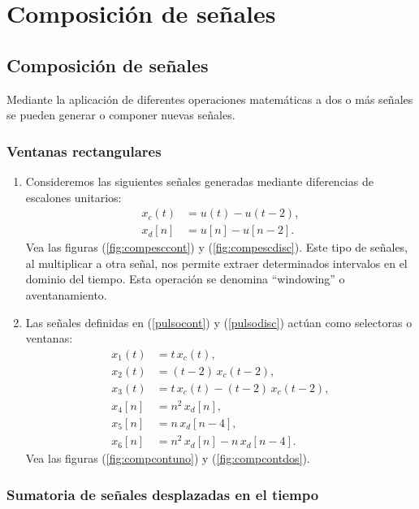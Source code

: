 \chapter{Composición de señales}

\section{Composición de señales}

Mediante la aplicación de diferentes operaciones matemáticas a
dos o más señales se pueden generar o componer nuevas señales.

\subsection{Ventanas rectangulares}

\begin{enumerate}
	\item Consideremos las siguientes señales generadas mediante
	diferencias de escalones unitarios:
	\begin{align}
		x_{c}(t) &= u(t) - u(t-2), \label{pulsocont} \\
		x_{d}[n] &= u[n] - u[n-2]. \label{pulsodisc}
	\end{align}
	Vea las figuras (\ref{fig:compesccont}) y (\ref{fig:compescdisc}).
	Este tipo de señales, al multiplicar a otra señal, nos permite
	extraer determinados intervalos en el dominio del tiempo. Esta
	operación se denomina ``windowing'' o aventanamiento.
	
	\item Las señales definidas en (\ref{pulsocont}) y
	(\ref{pulsodisc}) actúan como selectoras o ventanas:
	\begin{align}
		x_{1}(t) &= t \, x_{c}(t), \\
		x_{2}(t) &= (t - 2) \, x_{c}(t - 2), \\
		x_{3}(t) &= t \, x_{c}(t) - (t - 2) \, x_{c}(t - 2), \\
		x_{4}[n] &= n^{2} \, x_{d}[n], \\
		x_{5}[n] &= n \, x_{d}[n-4], \\ 
		x_{6}[n] &= n^{2} \, x_{d}[n] - n \, x_{d}[n-4].
	\end{align}
	Vea las figuras (\ref{fig:compcontuno}) y (\ref{fig:compcontdos}). 
\end{enumerate}

\subsection{Sumatoria de señales desplazadas en el tiempo}

